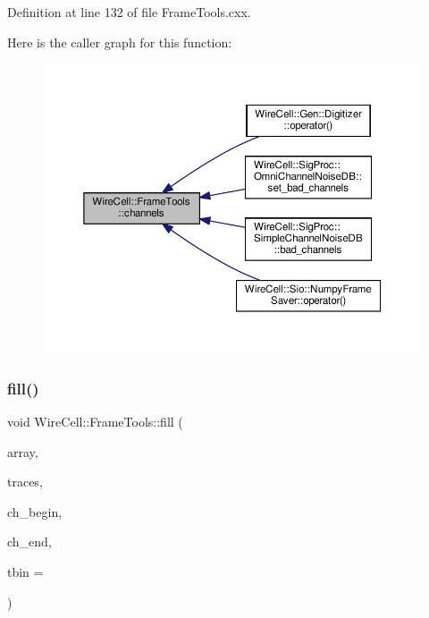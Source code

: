 Definition at line 132 of file Frame\+Tools.\+cxx.

Here is the caller graph for this function\+:
\nopagebreak
\begin{figure}[H]
\begin{center}
\leavevmode
\includegraphics[width=350pt]{namespace_wire_cell_1_1_frame_tools_aa68b64d0bc1fd1daa0646a35c26edcbb_icgraph}
\end{center}
\end{figure}
\mbox{\label{namespace_wire_cell_1_1_frame_tools_a09db410acc8cf771ec60faec4eae7eef}} 
\subsubsection{\texorpdfstring{fill()}{fill()}}
{\footnotesize\ttfamily void Wire\+Cell\+::\+Frame\+Tools\+::fill (\begin{DoxyParamCaption}\item[{\hyperlink{namespace_wire_cell_1_1_array_ab565fef5e33632bb02f0ed4be803020c}{Array\+::array\+\_\+xxf} \&}]{array,  }\item[{const \hyperlink{class_wire_cell_1_1_i_data_ae1a9f863380499bb43f39fabb6276660}{I\+Trace\+::vector} \&}]{traces,  }\item[{channel\+\_\+list\+::iterator}]{ch\+\_\+begin,  }\item[{channel\+\_\+list\+::iterator}]{ch\+\_\+end,  }\item[{int}]{tbin = {} }\end{DoxyParamCaption})}

